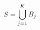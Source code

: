 \documentclass[preview]{standalone}
\begin{document}
\begin{align*}
\special{dvisvgm:raw <g id='unique000'>}S=\bigcup_{j=1}^{K}B_j\special{dvisvgm:raw </g>}
\end{align*}
\end{document}
